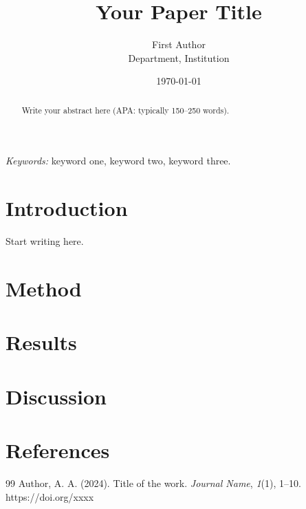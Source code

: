 \documentclass[12pt]{article}
\title{Your Paper Title}
\author{First Author\\ Department, Institution}
\date{\today}
\begin{document}
\maketitle

\begin{abstract}
Write your abstract here (APA: typically 150--250 words).
\end{abstract}

\textit{Keywords:} keyword one, keyword two, keyword three.

\section{Introduction}
Start writing here.

\section{Method}

\section{Results}

\section{Discussion}

\section*{References}
\begin{thebibliography}{99}
 Author, A. A. (2024). Title of the work. \textit{Journal Name}, \textit{1}(1), 1--10. https://doi.org/xxxx
\end{thebibliography}
\end{document}

